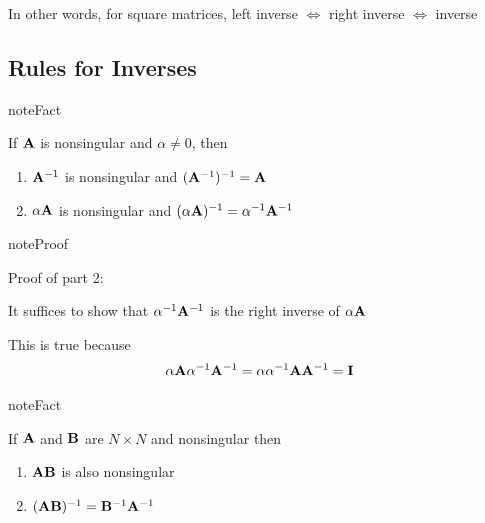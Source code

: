 \documentclass[letterpaper,10pt,english]{jupyterBook}
\begin{document}
\sphinxAtStartPar
In other words, for square matrices, left inverse \(\iff\) right inverse \(\iff\) inverse


\subsection{Rules for Inverses}
\label{\detokenize{05.linear_algebra:rules-for-inverses}}
\begin{sphinxadmonition}{note}{Fact}

\sphinxAtStartPar
If \({\bf A}\) is nonsingular and \(\alpha \ne 0\), then
\begin{enumerate}
%
\item {} 
\sphinxAtStartPar
\({\bf A}^{-1}\) is nonsingular and \(({\bf A}^{-1})^{-1} = {\bf A}\)

\item {} 
\sphinxAtStartPar
\(\alpha {\bf A}\) is nonsingular and \((\alpha {\bf A})^{-1} = \alpha^{-1} {\bf A}^{-1}\)

\end{enumerate}
\end{sphinxadmonition}

\begin{sphinxadmonition}{note}{Proof}

\sphinxAtStartPar
Proof of part 2:

\sphinxAtStartPar
It suffices to show that \(\alpha^{-1} {\bf A}^{-1}\) is the right inverse of
\(\alpha {\bf A}\)

\sphinxAtStartPar
This is true because
\begin{equation*}
\begin{split}
%
\alpha {\bf A} \alpha^{-1} {\bf A}^{-1} 
=
\alpha \alpha^{-1} {\bf A} {\bf A}^{-1} 
= {\bf I}
%
\end{split}
\end{equation*}\end{sphinxadmonition}

\begin{sphinxadmonition}{note}{Fact}

\sphinxAtStartPar
If \({\bf A}\) and \({\bf B}\) are \(N \times N\) and nonsingular then
\begin{enumerate}
%
\item {} 
\sphinxAtStartPar
\({\bf A} {\bf B}\) is also nonsingular

\item {} 
\sphinxAtStartPar
\(({\bf A} {\bf B})^{-1} = {\bf B}^{-1} {\bf A}^{-1}\)

\end{enumerate}
\end{sphinxadmonition}
\end{document}
